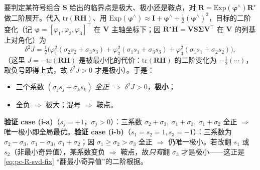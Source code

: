 \begin{derivation}
要判定某符号组合 $\mathbf{S}$ 给出的临界点是极大、极小还是鞍点，对 $\mathbf{R}=\mathrm{Exp}(\boldsymbol{\varphi}^\wedge)\mathbf{R}^\star$ 做二阶展开。代入 $\mathrm{tr}(\mathbf{R}\mathbf{H})$、用 $\mathrm{Exp}(\boldsymbol{\varphi}^\wedge)\approx\mathbf{I}+\boldsymbol{\varphi}^\wedge+\tfrac12(\boldsymbol{\varphi}^\wedge)^2$，目标的二阶变化（记 $\boldsymbol{\varphi}=[\varphi_1,\varphi_2,\varphi_3]^\top$ 在 $\mathbf{V}$ 主轴坐标下；因 $\mathbf{R}^\star\mathbf{H}=\mathbf{V}\mathbf{S}\boldsymbol{\Sigma}\mathbf{V}^\top$ 在 $\mathbf{V}$ 的列基上对角化）为
\begin{equation}
  \delta^2 J=\tfrac12\Big(\varphi_1^2(\sigma_2 s_2+\sigma_3 s_3)+\varphi_2^2(\sigma_1 s_1+\sigma_3 s_3)+\varphi_3^2(\sigma_1 s_1+\sigma_2 s_2)\Big),
  \label{eq:pc-wahba-secondorder}
\end{equation}
（这里 $J=-\mathrm{tr}(\mathbf{R}\mathbf{H})$ 是被最小化的代价：$\mathrm{tr}(\mathbf{R}\mathbf{H})$ 的二阶变化为 $-\tfrac12(\cdots)$，取负号即得上式，故 $\delta^2 J>0$ 才是极小）。于是：
\begin{itemize}
  \item 三个系数 $(\sigma_j s_j+\sigma_k s_k)$ \emph{全正} $\Rightarrow$ $\delta^2 J>0$，\textbf{极小}；
  \item 全负 $\Rightarrow$ 极大；混号 $\Rightarrow$ 鞍点。
\end{itemize}
\textbf{验证 case (i-a)}（$s_j=+1$，$\sigma_j>0$）：三系数 $\sigma_2+\sigma_3,\ \sigma_1+\sigma_3,\ \sigma_1+\sigma_2$ 全正 $\Rightarrow$ 唯一极小即全局最优。\textbf{验证 case (i-b)}（$s_1=s_2=1,s_3=-1$）：三系数为 $\sigma_2-\sigma_3,\ \sigma_1-\sigma_3,\ \sigma_1+\sigma_2$；因 $\sigma_1\ge\sigma_2>\sigma_3$ 全正 $\Rightarrow$ 仍唯一极小。若改翻 $s_1$ 或 $s_2$（非最小奇异值），某系数变负 $\Rightarrow$ 鞍点，故\emph{只有}翻 $\sigma_3$ 才是极小——这正是 \cref{eq:pc-R-svd-fix} “翻最小奇异值”的二阶根据。
\end{derivation}

